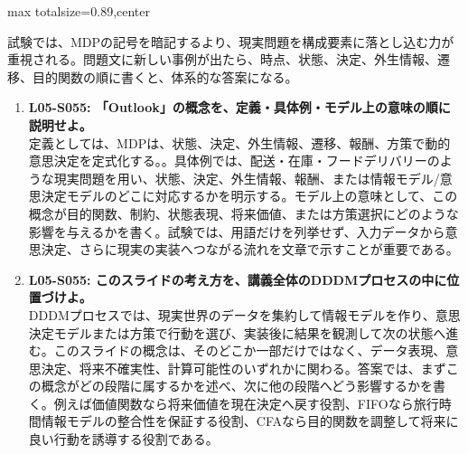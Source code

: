 \begin{minipage}[t]{0.58\textwidth}
\begin{adjustbox}{max totalsize={\textwidth}{0.89\textheight},center}
\begin{minipage}{\textwidth}
試験では、MDPの記号を暗記するより、現実問題を構成要素に落とし込む力が重視される。問題文に新しい事例が出たら、時点、状態、決定、外生情報、遷移、目的関数の順に書くと、体系的な答案になる。\par{}\begin{enumerate}\item \textbf{L05-S055: 「Outlook」の概念を、定義・具体例・モデル上の意味の順に説明せよ。}\\定義としては、MDPは、状態、決定、外生情報、遷移、報酬、方策で動的意思決定を定式化する。。具体例では、配送・在庫・フードデリバリーのような現実問題を用い、状態、決定、外生情報、報酬、または情報モデル/意思決定モデルのどこに対応するかを明示する。モデル上の意味として、この概念が目的関数、制約、状態表現、将来価値、または方策選択にどのような影響を与えるかを書く。試験では、用語だけを列挙せず、入力データから意思決定、さらに現実の実装へつながる流れを文章で示すことが重要である。\item \textbf{L05-S055: このスライドの考え方を、講義全体のDDDMプロセスの中に位置づけよ。}\\DDDMプロセスでは、現実世界のデータを集約して情報モデルを作り、意思決定モデルまたは方策で行動を選び、実装後に結果を観測して次の状態へ進む。このスライドの概念は、そのどこか一部だけではなく、データ表現、意思決定、将来不確実性、計算可能性のいずれかに関わる。答案では、まずこの概念がどの段階に属するかを述べ、次に他の段階へどう影響するかを書く。例えば価値関数なら将来価値を現在決定へ戻す役割、FIFOなら旅行時間情報モデルの整合性を保証する役割、CFAなら目的関数を調整して将来に良い行動を誘導する役割である。\end{enumerate}
\end{minipage}
\end{adjustbox}
\end{minipage}

